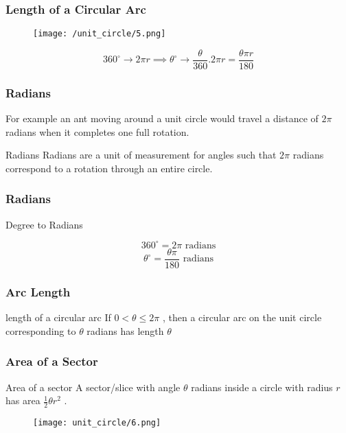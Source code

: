     \begin{frame}
        \frametitle{Length of a Circular Arc}
        \begin{figure}
            \centering
            \texttt{[image: /unit\_circle/5.png]}
        \end{figure}
        \[ 360^{\circ}   \rightarrow  2 \pi r \implies \theta^{\circ}  \rightarrow \frac{\theta}{360}.2\pi r  = \frac{\theta \pi r}{180}\] 
    \end{frame}
    
    \begin{frame}
        \frametitle{Radians}
        For example an ant moving around a unit circle would travel a distance of $2\pi$ radians
        when it completes one full rotation.
       \begin{block}{Radians}
        Radians are a unit of measurement for angles such that $2\pi$ radians correspond
        to a rotation through an entire circle.
       \end{block}
    \end{frame}
    

    \begin{frame}
        \frametitle{Radians}
       \begin{block}{Degree to Radians}
    
        \[ 360^{\circ} = 2 \pi \text{ radians} \]
        \[ \theta ^{\circ}  = \frac{\theta \pi}{180} \text{ radians} \]
        
       \end{block}
    \end{frame}
    
    \begin{frame}
        \frametitle{Arc Length}
        \begin{block}{length of a circular arc}
            If $0 < \theta \leq 2\pi$ , then a circular arc on the unit circle corresponding to $\theta$ radians
            has length $\theta$         
        \end{block}
    \end{frame}

    \begin{frame}
        \frametitle{Area of a Sector}
        \begin{block}{Area of a sector}
            A sector/slice with angle $\theta$ radians inside a circle with radius $r$ has area $\frac{1}{2} \theta r^{2}$ .
        \end{block}
        \begin{figure}[h]    
            \centering
            \texttt{[image: unit\_circle/6.png]}
        \end{figure}
    \end{frame}
    
